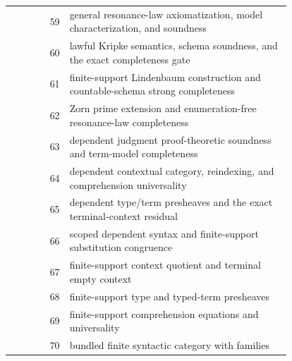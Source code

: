 \documentclass[11pt]{article}
\theoremstyle{definition}
\begin{document}
\begin{center}
\begin{tabular}{@{}r p{0.79\linewidth}@{}}
59 & general resonance-law axiomatization, model characterization, and soundness \\
60 & lawful Kripke semantics, schema soundness, and the exact completeness gate \\
61 & finite-support Lindenbaum construction and countable-schema strong completeness \\
62 & Zorn prime extension and enumeration-free resonance-law completeness \\
63 & dependent judgment proof-theoretic soundness and term-model completeness \\
64 & dependent contextual category, reindexing, and comprehension universality \\
65 & dependent type/term presheaves and the exact terminal-context residual \\
66 & scoped dependent syntax and finite-support substitution congruence \\
67 & finite-support context quotient and terminal empty context \\
68 & finite-support type and typed-term presheaves \\
69 & finite-support comprehension equations and universality \\
70 & bundled finite syntactic category with families \\
\bottomrule
\end{tabular}
\end{center}
\end{document}
